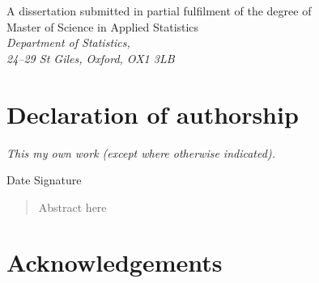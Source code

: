 \documentclass[a4paper,11pt,openany,extrafontsizes]{memoir}
\begin{document}
\begin{titlingpage}
\begin{center}
    \vfill
    \large{A dissertation submitted in partial fulfilment of the degree of\\
      Master of Science in Applied Statistics}\\
    \vspace{.5cm}
    \large{\emph{Department of Statistics,\\ 24--29 St Giles, Oxford, OX1 3LB}}\\
    \vspace{1cm}
    \large{\thedate}
  \end{center}
\end{titlingpage}


\frontmatter

\cleardoublepage%

\chapter*{Declaration of authorship}

\emph{This my own work (except where otherwise indicated).}\\[2cm]

\begin{center}
  Date \hspace{.5\linewidth} Signature
\end{center}


\cleardoublepage%

\begin{abstract}
  Abstract here
\end{abstract}

\cleardoublepage%

\chapter*{Acknowledgements}%
\label{cha:acknowledgements}
\end{document}
